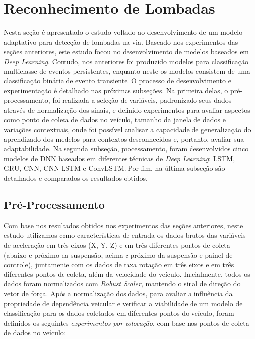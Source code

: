 \chapter{Reconhecimento de Lombadas}
\label{cap:deteccao_lombadas}

Nesta seção é apresentado o estudo voltado ao desenvolvimento de um modelo adaptativo para detecção de lombadas na via. Baseado nos experimentos das seções anteriores, este estudo focou no desenvolvimento de modelos baseados em \textit{Deep Learning}. Contudo, nos anteriores foi produzido modelos para classificação multiclasse de eventos persistentes, enquanto neste os modelos consistem de uma classificação binária de evento transiente. O processo de desenvolvimento e experimentação é detalhado nas próximas subseções. Na primeira delas, o pré-processamento, foi realizada a seleção de variáveis, padronizado seus dados através de normalização dos sinais, e definido experimentos para avaliar aspectos como ponto de coleta de dados no veículo, tamanho da janela de dados e variações contextuais, onde foi possível analisar a capacidade de generalização do aprendizado dos modelos para contextos desconhecidos e, portanto, avaliar sua adaptabilidade. Na segunda subseção, processamento, foram desenvolvidos cinco modelos de DNN baseados em diferentes técnicas de \textit{Deep Learning}: LSTM, GRU, CNN, CNN-LSTM e ConvLSTM. Por fim, na última subseção são detalhados e comparados os resultados obtidos.

\section{Pré-Processamento}

Com base nos resultados obtidos nos experimentos das seções anteriores, neste estudo utilizamos como características de entrada os dados brutos das variáveis de aceleração em três eixos (X, Y, Z) e em três diferentes pontos de coleta (abaixo e próximo da suspensão, acima e próximo da suspensão e painel de controle), juntamente com os dados de taxa rotação em três eixos e em três diferentes pontos de coleta, além da velocidade do veículo. Inicialmente, todos os dados foram normalizados com \textit{Robust Scaler}, mantendo o sinal de direção do vetor de força. Após a normalização dos dados, para avaliar a influência da propriedade de dependência veicular e verificar a viabilidade de um modelo de classificação para os dados coletados em diferentes pontos do veículo, foram definidos os seguintes \emph{experimentos por colocação}, com base nos pontos de coleta de dados no veículo:

